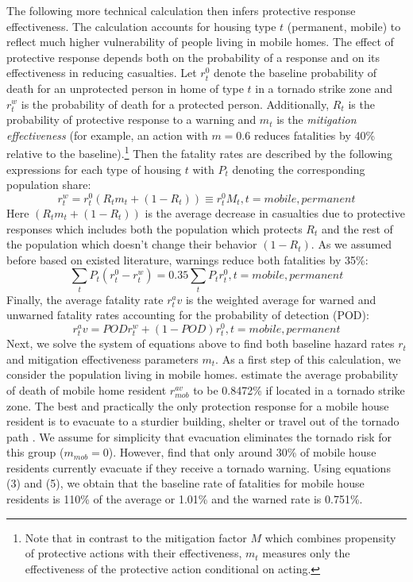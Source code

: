\documentclass{ametsocV6.1}
\newcommand{\add}[1]{{\color{red}#1}}
\begin{document}
The following more technical calculation then infers protective response effectiveness. The calculation accounts for housing type $t$ (permanent, mobile) to reflect much higher vulnerability of people living in mobile homes. The effect of protective response depends both on the probability of a response and on its effectiveness in reducing casualties. Let $r_t^0$ denote the baseline probability of death for an unprotected person in home of type $t$ in a tornado strike zone and $r_t^w$ is the probability of death for a protected person. Additionally,  $R_t$ is the probability of protective response to a warning and $m_t$ is the \textit{mitigation effectiveness} (for example, an action with $m=0.6$ reduces fatalities by 40\% relative to the baseline).\footnote{Note that in contrast to the mitigation factor $M$ which combines propensity of protective actions with their effectiveness, $m_t$ measures only the effectiveness of the protective action conditional on acting.} Then the fatality rates are described by the following expressions for each type of housing $t$ with $P_t$ denoting the corresponding population share:
\begin{equation}
r^w_t=r^0_t(R_tm_t+(1-R_t))\equiv r^0_t M_t,t=mobile,permanent 
\end{equation}
\add{Here $(R_tm_t+(1-R_t))$ is the average decrease in casualties due to protective responses which includes both the population which protects $R_t$ and the rest of the population which doesn't change their behavior $(1-R_t)$.} \add{As we assumed before based on existed literature,} warnings reduce both fatalities by 35\%:
\begin{equation}
\sum_t P_t (r^0_t-r^w_t)=0.35 \sum_t P_t r^0_t,t=mobile,permanent 
\end{equation}
Finally, the average fatality rate $r_t^av$ is the weighted average for warned and unwarned fatality rates accounting for the probability of detection (POD):
\begin{equation}
r_t^av=PODr_t^w+(1-POD)r_t^0,t=mobile,permanent     
\end{equation}
Next, we solve the system of equations above to find both baseline hazard rates $r_t$ and mitigation effectiveness parameters $m_t$. As a first step \add{of this calculation}, we consider the population living in mobile homes. \citet{simmons_economic_2013} estimate the average probability of death of mobile home resident $r_{mob}^{av}$ to be 0.8472\% if located in a tornado strike zone. The best and practically the only protection response for a mobile house resident is to evacuate to a sturdier building, shelter or travel out of the tornado path \citep{schmidlin_tornado_2009}. We assume for simplicity that evacuation eliminates the tornado risk for this group ($m_{mob}=0$). However, \citet{schmidlin_tornado_2009} find that only around 30\% of mobile house residents currently evacuate if they receive a tornado warning. Using equations (3) and (5), we obtain that the baseline rate of fatalities for mobile house residents is 110\% of the average or 1.01\% and the warned rate is 0.751\%.
\end{document}
